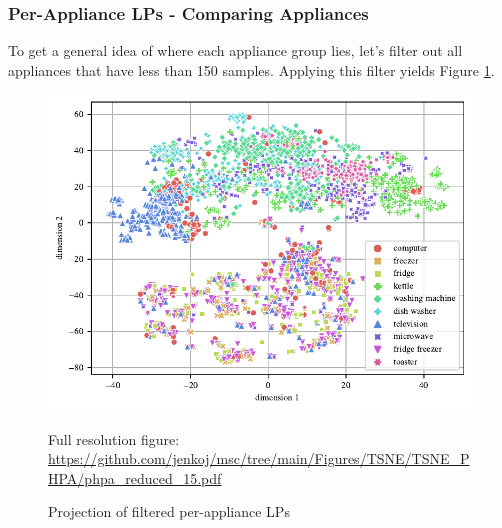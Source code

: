 \subsubsection{Per-Appliance LPs - Comparing Appliances}





To get a general idea of where each appliance group lies,
let's filter out all appliances that have less than 150 samples.
Applying this filter yields Figure \ref{fig:tsne_papb_scatter_all_reduced}.

\begin{figure}[H]
	\centering
	\caption{Projection of filtered per-appliance LPs}
	\includegraphics[]{Figures/TSNE/TSNE_PHPA/phpa_reduced_15.pdf}
	\label{fig:tsne_papb_scatter_all_reduced}
	\par
	\par\footnotesize{Full resolution figure: \url{https://github.com/jenkoj/msc/tree/main/Figures/TSNE/TSNE_PHPA/phpa_reduced_15.pdf}}
\end{figure}

